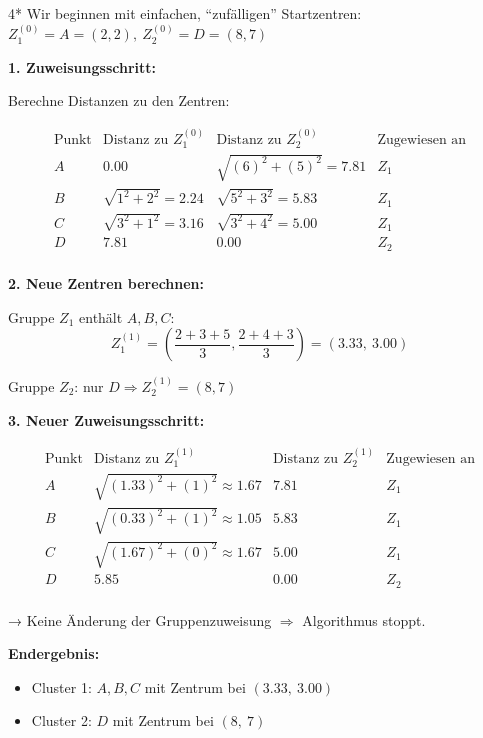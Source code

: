 \begin{aufgabe}{4*}
Wir beginnen mit einfachen, ``zufälligen'' Startzentren: \( Z_1^{(0)} = A = (2,2),\ Z_2^{(0)} = D = (8,7) \)

\vspace{0.5em}
\textbf{1. Zuweisungsschritt:}

Berechne Distanzen zu den Zentren:

\[
\begin{array}{l|c|c|l}
\text{Punkt} & \text{Distanz zu } Z_1^{(0)} & \text{Distanz zu } Z_2^{(0)} & \text{Zugewiesen an} \\
\hline
A & 0.00 & \sqrt{(6)^2 + (5)^2} = 7.81 & Z_1 \\
B & \sqrt{1^2 + 2^2} = 2.24 & \sqrt{5^2 + 3^2} = 5.83 & Z_1 \\
C & \sqrt{3^2 + 1^2} = 3.16 & \sqrt{3^2 + 4^2} = 5.00 & Z_1 \\
D & 7.81 & 0.00 & Z_2 \\
\end{array}
\]

\vspace{0.5em}
\textbf{2. Neue Zentren berechnen:}

Gruppe \( Z_1 \) enthält \( A, B, C \):  
\[
Z_1^{(1)} = \left( \frac{2 + 3 + 5}{3}, \frac{2 + 4 + 3}{3} \right) = (3.33,\ 3.00)
\]

Gruppe \( Z_2 \): nur \( D \Rightarrow Z_2^{(1)} = (8,7) \)

\vspace{0.5em}
\textbf{3. Neuer Zuweisungsschritt:}

\[
\begin{array}{l|c|c|l}
\text{Punkt} & \text{Distanz zu } Z_1^{(1)} & \text{Distanz zu } Z_2^{(1)} & \text{Zugewiesen an} \\
\hline
A & \sqrt{(1.33)^2 + (1)^2} \approx 1.67 & 7.81 & Z_1 \\
B & \sqrt{(0.33)^2 + (1)^2} \approx 1.05 & 5.83 & Z_1 \\
C & \sqrt{(1.67)^2 + (0)^2} \approx 1.67 & 5.00 & Z_1 \\
D & 5.85 & 0.00 & Z_2 \\
\end{array}
\]

→ Keine Änderung der Gruppenzuweisung $\Rightarrow$ Algorithmus stoppt.

\vspace{0.5em}
\textbf{Endergebnis:}

\begin{itemize}
  \item Cluster 1: $A, B, C$ mit Zentrum bei $(3.33,\ 3.00)$
  \item Cluster 2: $D$ mit Zentrum bei $(8,\ 7)$
\end{itemize}
\end{aufgabe}


